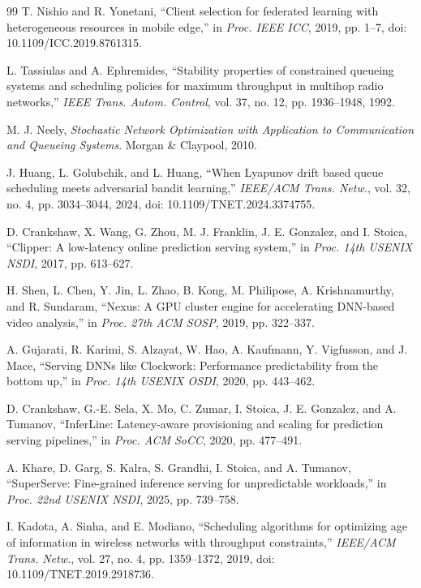 \documentclass[10pt,journal]{IEEEtran}
\begin{document}
\begin{thebibliography}{99}
T. Nishio and R. Yonetani, ``Client selection for federated learning with
heterogeneous resources in mobile edge,'' in \emph{Proc. IEEE ICC}, 2019,
pp. 1--7, doi: 10.1109/ICC.2019.8761315.

L. Tassiulas and A. Ephremides,
``Stability properties of constrained queueing systems and scheduling policies
for maximum throughput in multihop radio networks,'' \emph{IEEE Trans.
Autom. Control}, vol. 37, no. 12, pp. 1936--1948, 1992.

M. J. Neely, \emph{Stochastic Network Optimization with Application to
Communication and Queueing Systems}. Morgan \& Claypool, 2010.

J. Huang, L. Golubchik, and L. Huang,
``When Lyapunov drift based queue scheduling meets adversarial bandit
learning,'' \emph{IEEE/ACM Trans. Netw.}, vol. 32, no. 4, pp. 3034--3044,
2024, doi: 10.1109/TNET.2024.3374755.

D. Crankshaw, X. Wang, G. Zhou, M. J. Franklin, J. E. Gonzalez, and I. Stoica,
``Clipper: A low-latency online prediction serving system,'' in
\emph{Proc. 14th USENIX NSDI}, 2017, pp. 613--627.

H. Shen, L. Chen, Y. Jin, L. Zhao, B. Kong, M. Philipose, A. Krishnamurthy,
and R. Sundaram, ``Nexus: A GPU cluster engine for accelerating DNN-based
video analysis,'' in \emph{Proc. 27th ACM SOSP}, 2019, pp. 322--337.

A. Gujarati, R. Karimi, S. Alzayat, W. Hao, A. Kaufmann, Y. Vigfusson, and
J. Mace, ``Serving DNNs like Clockwork: Performance predictability from the
bottom up,'' in \emph{Proc. 14th USENIX OSDI}, 2020, pp. 443--462.

D. Crankshaw, G.-E. Sela, X. Mo, C. Zumar, I. Stoica, J. E. Gonzalez, and
A. Tumanov, ``InferLine: Latency-aware provisioning and scaling for prediction
serving pipelines,'' in \emph{Proc. ACM SoCC}, 2020, pp. 477--491.

A. Khare, D. Garg, S. Kalra, S. Grandhi, I. Stoica, and A. Tumanov,
``SuperServe: Fine-grained inference serving for unpredictable workloads,'' in
\emph{Proc. 22nd USENIX NSDI}, 2025, pp. 739--758.

I. Kadota, A. Sinha, and E. Modiano, ``Scheduling algorithms for optimizing
age of information in wireless networks with throughput constraints,''
\emph{IEEE/ACM Trans. Netw.}, vol. 27, no. 4, pp. 1359--1372, 2019,
doi: 10.1109/TNET.2019.2918736.


\end{thebibliography}
\end{document}
